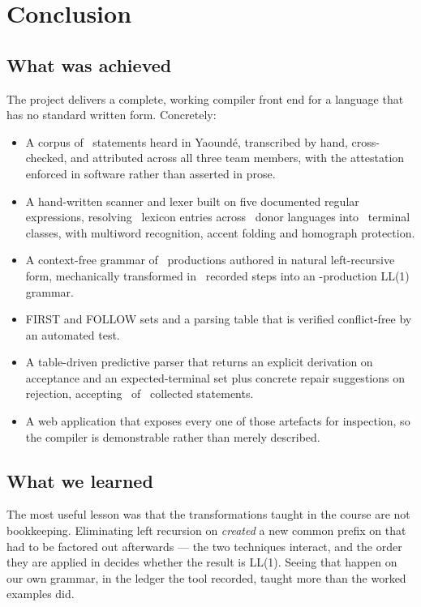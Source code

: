 \section{Conclusion}

\subsection{What was achieved}

The project delivers a complete, working compiler front end for a language that has no
standard written form. Concretely:

\begin{itemize}[leftmargin=1.4em, itemsep=0.2em]
  \item A corpus of \CorpusTotal\ statements heard in Yaound\'e, transcribed by hand,
        cross-checked, and attributed across all three team members, with the attestation
        enforced in software rather than asserted in prose.
  \item A hand-written scanner and lexer built on five documented regular expressions,
        resolving \LexiconTotal\ lexicon entries across \OriginCount\ donor languages into
        \TerminalCount\ terminal classes, with multiword recognition, accent folding and
        homograph protection.
  \item A context-free grammar of \ProductionCount\ productions authored in natural
        left-recursive form, mechanically transformed in \LedgerSteps\ recorded steps into
        an \ExecProductionCount-production LL(1) grammar.
  \item FIRST and FOLLOW sets and a parsing table that is verified conflict-free by an
        automated test.
  \item A table-driven predictive parser that returns an explicit derivation on acceptance
        and an expected-terminal set plus concrete repair suggestions on rejection,
        accepting \CorpusAccepted\ of \CorpusTotal\ collected statements.
  \item A web application that exposes every one of those artefacts for inspection, so the
        compiler is demonstrable rather than merely described.
\end{itemize}

\subsection{What we learned}

The most useful lesson was that the transformations taught in the course are not
bookkeeping. Eliminating left recursion on  \emph{created} a new common prefix
on  that had to be factored out afterwards --- the two techniques interact, and the
order they are applied in decides whether the result is LL(1). Seeing that happen on our own
grammar, in the ledger the tool recorded, taught more than the worked examples did.

